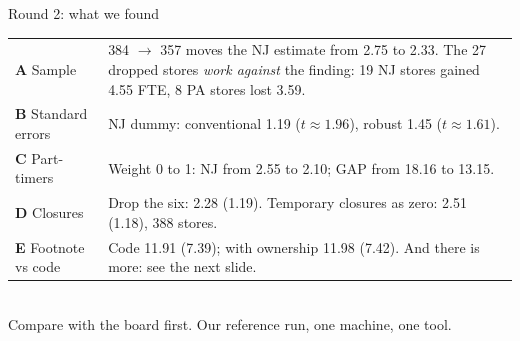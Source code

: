 \documentclass[aspectratio=169,11pt]{beamer}
\begin{document}
\begin{frame}{Round 2: what we found}
\begin{tabular}{@{}lp{}@{}}
\toprule
\textbf{A} Sample & 384 $\to$ 357 moves the NJ estimate from 2.75 to 2.33. The 27 dropped stores \emph{work against} the finding: 19 NJ stores gained 4.55 FTE, 8 PA stores lost 3.59.\\
\textbf{B} Standard errors & NJ dummy: conventional 1.19 ($t\approx1.96$), robust 1.45 ($t\approx1.61$).\\
\textbf{C} Part-timers & Weight 0 to 1: NJ from 2.55 to 2.10; GAP from 18.16 to 13.15.\\
\textbf{D} Closures & Drop the six: 2.28 (1.19). Temporary closures as zero: 2.51 (1.18), 388 stores.\\
\textbf{E} Footnote vs code & Code 11.91 (7.39); with ownership 11.98 (7.42). And there is more: see the next slide.\\
\bottomrule
\end{tabular}\\[0.6em]
\small Compare with the board first. Our reference run, one machine, one tool.
\end{frame}
\end{document}
